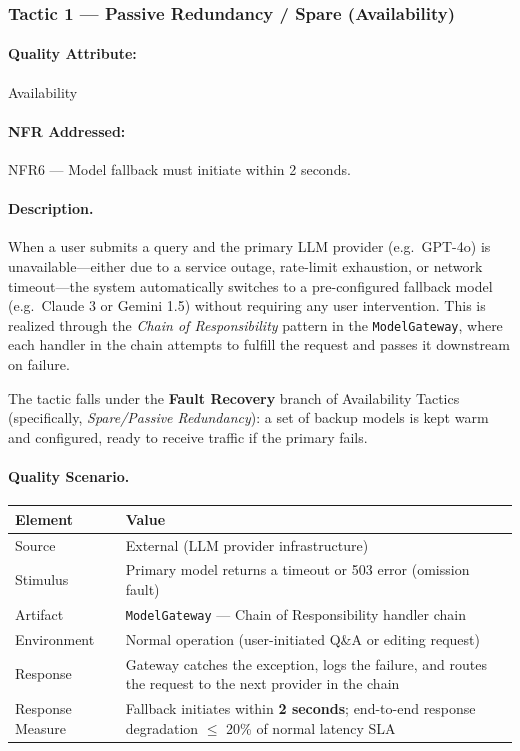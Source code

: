 \documentclass[12pt,a4paper]{article}
\begin{document}
\subsubsection{Tactic 1 --- Passive Redundancy / Spare (Availability)}

\paragraph{Quality Attribute:} Availability

\paragraph{NFR Addressed:} NFR6 --- Model fallback must initiate within 2 seconds.

\paragraph{Description.}
When a user submits a query and the primary LLM provider (e.g.\ GPT-4o) is unavailable---either
due to a service outage, rate-limit exhaustion, or network timeout---the system automatically
switches to a pre-configured fallback model (e.g.\ Claude 3 or Gemini 1.5) without requiring any
user intervention. This is realized through the \textit{Chain of Responsibility} pattern in the
\texttt{ModelGateway}, where each handler in the chain attempts to fulfill the request and passes it
downstream on failure.

The tactic falls under the \textbf{Fault Recovery} branch of Availability Tactics (specifically,
\textit{Spare/Passive Redundancy}): a set of backup models is kept warm and configured, ready to
receive traffic if the primary fails.

\paragraph{Quality Scenario.}

\begin{center}
\begin{tabular}{@{}L{3.5cm}L{9cm}@{}}
\toprule
\textbf{Element} & \textbf{Value} \\
\midrule
Source & External (LLM provider infrastructure) \\
Stimulus & Primary model returns a timeout or 503 error (omission fault) \\
Artifact & \texttt{ModelGateway} --- Chain of Responsibility handler chain \\
Environment & Normal operation (user-initiated Q\&A or editing request) \\
Response & Gateway catches the exception, logs the failure, and routes the request to the next provider in the chain \\
Response Measure & Fallback initiates within \textbf{2 seconds}; end-to-end response degradation $\leq$ 20\% of normal latency SLA \\
\bottomrule
\end{tabular}
\end{center}
\end{document}
